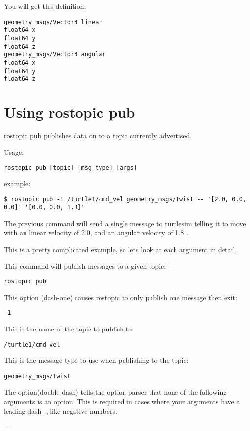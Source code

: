 You will get this definition:

\begin{lstlisting}[breaklines=true language=bash]
geometry_msgs/Vector3 linear
float64 x
float64 y
float64 z
geometry_msgs/Vector3 angular
float64 x
float64 y
float64 z
\end{lstlisting}


\section{Using rostopic pub}
rostopic pub publishes data on to a topic currently advertised.

Usage:
\begin{lstlisting}[breaklines=true languages=bash]
rostopic pub [topic] [msg_type] [args]
\end{lstlisting}

example:
\begin{lstlisting}[breaklines=true langauges=bash]
$ rostopic pub -1 /turtle1/cmd_vel geometry_msgs/Twist -- '[2.0, 0.0, 0.0]' '[0.0, 0.0, 1.8]'
\end{lstlisting}

The previous command will send a single message to turtlesim telling it to move with an linear velocity of 2.0, and an angular velocity of 1.8 .

This is a pretty complicated example, so lets look at each argument in detail.

This command will publish messages to a given topic:
\begin{lstlisting}[breaklines=true language=bash]
rostopic pub
\end{lstlisting}

This option (dash-one) causes rostopic to only publish one message then exit:
\begin{lstlisting}[breaklines=true language=bash]
-1
\end{lstlisting}

This is the name of the topic to publish to:
\begin{lstlisting}[breaklines=true language=bash]
/turtle1/cmd_vel
\end{lstlisting}

This is the message type to use when publishing to the topic:
\begin{lstlisting}[breaklines=true languages=bash]
geometry_msgs/Twist
\end{lstlisting}

The option(double-dash) tells the option parser that none of the following arguments is an option. This is required in cases where your arguments have a leading dash -, like negative numbers.
\begin{lstlisting}[breaklines=true languages=bash]
--
\end{lstlisting}

